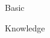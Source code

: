 \documentclass{article}
\newenvironment{displaySourceCode}[1][Basic]
{
    \begin{center}
    #1
}
{
    \end{center}
}
\begin{document}
\begin{displaySourceCode}
Knowledge
\end{displaySourceCode}
\end{document}
